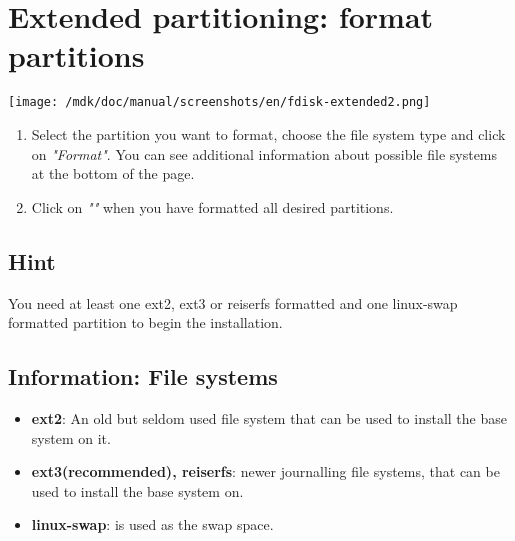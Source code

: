 \section{Extended partitioning: format partitions}
\texttt{[image: /mdk/doc/manual/screenshots/en/fdisk-extended2.png]} \\
\begin{enumerate}
\item Select the partition you want to format, choose the file system type and click on \textit{"Format"}. You can see additional information about possible file systems at the bottom of the page.\\
\item Click on \textit{""} when you have formatted all desired partitions.\\
\end{enumerate}
\subsection{Hint}
You need at least one ext2, ext3 or reiserfs formatted and one linux-swap formatted partition to begin the installation.\\
\subsection{Information: File systems}
\begin{itemize}
\item \textbf{ext2}: An old but seldom used file system that can be used to install the base system on it.\\
\item \textbf{ext3(recommended), reiserfs}: newer journalling file systems, that can be used to install the base system on.\\
\item \textbf{linux-swap}: is used as the swap space.\\
\end{itemize}
